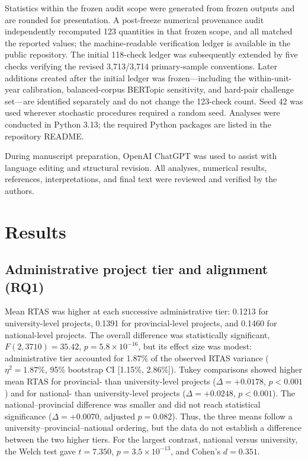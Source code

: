 \documentclass[pdflatex,sn-apa]{sn-jnl}
\begin{document}
Statistics within the frozen audit scope were generated from frozen outputs and are rounded for presentation. A post-freeze numerical provenance audit independently recomputed 123 quantities in that frozen scope, and all matched the reported values; the machine-readable verification ledger is available in the public repository. The initial 118-check ledger was subsequently extended by five checks verifying the revised 3,713/3,714 primary-sample conventions. Later additions created after the initial ledger was frozen---including the within-unit-year calibration, balanced-corpus BERTopic sensitivity, and hard-pair challenge set---are identified separately and do not change the 123-check count. Seed 42 was used wherever stochastic procedures required a random seed. Analyses were conducted in Python 3.13; the required Python packages are listed in the repository README.

During manuscript preparation, OpenAI ChatGPT was used to assist with language editing and structural revision. All analyses, numerical results, references, interpretations, and final text were reviewed and verified by the authors.

\section{Results}

\subsection{Administrative project tier and alignment (RQ1)}

Mean RTAS was higher at each successive administrative tier: 0.1213 for university-level projects, 0.1391 for provincial-level projects, and 0.1460 for national-level projects. The overall difference was statistically significant, $F(2,3710)=35.42$, $p=5.8\times10^{-16}$, but its effect size was modest: administrative tier accounted for 1.87\% of the observed RTAS variance ($\eta^2=1.87\%$, 95\% bootstrap CI [1.15\%, 2.86\%]). Tukey comparisons showed higher mean RTAS for provincial- than university-level projects ($\Delta=+0.0178$, $p<0.001$) and for national- than university-level projects ($\Delta=+0.0248$, $p<0.001$). The national--provincial difference was smaller and did not reach statistical significance ($\Delta=+0.0070$, adjusted $p=0.082$). Thus, the three means follow a university--provincial--national ordering, but the data do not establish a difference between the two higher tiers. For the largest contrast, national versus university, the Welch test gave $t=7.350$, $p=3.5\times10^{-13}$, and Cohen's $d=0.351$.
\end{document}
